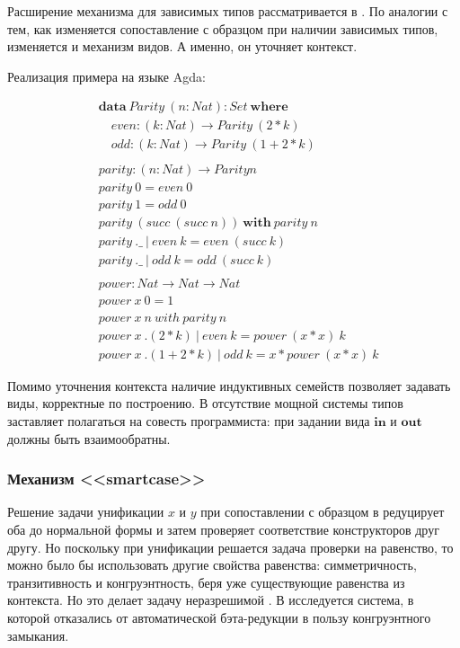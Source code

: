 Расширение механизма для зависимых типов рассматривается в
\cite{the-view-from-the-left}. По аналогии с тем, как
изменяется сопоставление с образцом при наличии зависимых типов,
изменяется и механизм видов. А именно, он уточняет контекст.

Реализация примера на языке Agda:

\begin{align*}
&\mathbf{data}\ Parity\ (n : Nat) : Set\ \mathbf{where}\\
&\quad even : (k : Nat) \to Parity\ (2 * k)\\
&\quad odd : (k : Nat) \to Parity\ (1 + 2 * k)\\
\\
&parity : (n : Nat) \to Parity n\\
&parity\ 0 = even\ 0\\
&parity\ 1 = odd\ 0\\
&parity\ (succ\ (succ\ n))\ \mathbf{with}\ parity\ n\\
&parity\ .\_\ |\ even\ k = even\ (succ\ k)\\
&parity\ .\_\ |\ odd\ k = odd\ (succ\ k)\\
\\
&power : Nat \to Nat \to Nat\\
&power\ x\ 0 = 1\\
&power\ x\ n\ with\ parity\ n\\
&power\ x\ .(2 * k)\ |\ even\ k = power\ (x * x)\ k\\
&power\ x\ .(1 + 2 * k)\ |\ odd\ k = x * power\ (x * x)\ k
\end{align*}

Помимо уточнения контекста наличие индуктивных семейств позволяет
задавать виды, корректные по построению. В \cite{views} отсутствие
мощной системы типов заставляет полагаться на совесть программиста:
при задании вида \(\mathbf{in}\) и \(\mathbf{out}\) должны быть взаимообратны.

\subsubsection{Механизм <<smartcase>>}

Решение задачи унификации \(x\) и \(y\) при сопоставлении с образцом в
\cite{dependent-pattern-matching} редуцирует оба до нормальной формы и затем
проверяет соответствие конструкторов друг другу. Но поскольку при унификации
решается задача проверки на равенство, то можно было бы использовать другие
свойства равенства: симметричность, транзитивность и конгруэнтность, беря уже
существующие равенства из контекста. Но это делает задачу неразрешимой
\cite{programming-up-to-congruence}. В \cite{programming-up-to-congruence}
исследуется система, в которой отказались от автоматической бэта-редукции в
пользу конгруэнтного замыкания.

